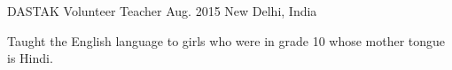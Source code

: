 \begin{cventries}

\cventry
{DASTAK} %
{Volunteer Teacher} %
{Aug. 2015} %
{New Delhi, India} %
{ %
\vspace{0.5mm}
\begin{cvitems}
	\item {Taught the English language to girls who were in grade 10 whose mother tongue is Hindi.}
\end{cvitems}
}





\end{cventries}